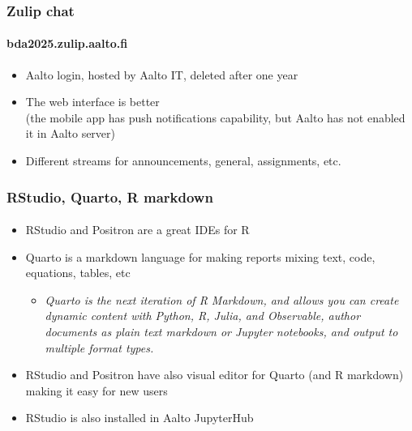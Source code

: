 \documentclass[english,t]{beamer}
\begin{document}
\begin{frame}

  \frametitle{Zulip chat}  %
  \framesubtitle{bda2025.zulip.aalto.fi}

  \begin{itemize}
  \item Aalto login, hosted by Aalto IT, deleted after one year
  \item The web interface is better\\ (the mobile app has push
    notifications capability, but Aalto has not enabled it in Aalto
    server)
  \item Different streams for announcements, general, assignments, etc.
  \end{itemize}
  
\end{frame}

\begin{frame}

  \frametitle{RStudio, Quarto, R markdown}  %
  \framesubtitle{}

  \begin{itemize}
  \item RStudio and Positron are a great IDEs for R
  \item Quarto is a markdown language for making reports mixing
    text, code, equations, tables, etc
    \begin{itemize}
    \item \textit{Quarto is the next iteration of R Markdown, and
        allows you can create dynamic content with Python, R, Julia,
        and Observable, author documents as plain text markdown or
        Jupyter notebooks, and output to multiple format types.}
    \end{itemize}
  \item RStudio and Positron have also visual editor for Quarto (and R markdown)
    making it easy for new users
  \item RStudio is also installed in Aalto JupyterHub
  \end{itemize}
  
\end{frame}  
\end{document}
